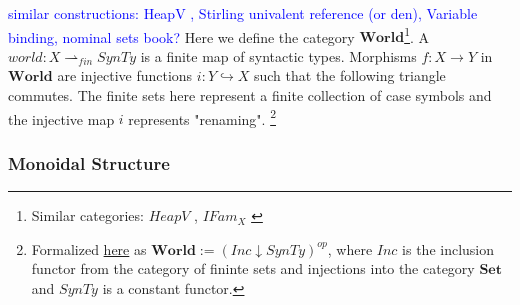 \documentclass{article}
\newcommand{\blue}[1]{\textcolor{blue}{#1}}
\newcommand{\world}{{\mathbf{World}}}
\begin{document}
\blue{similar constructions: HeapV \cite{SIMPSON-Independence}, Stirling univalent reference 
(or den), Variable binding, nominal sets book?}
 Here we define the category $\world$\footnote{Similar categories: $HeapV$ \cite{SIMPSON-Independence}, $IFam_X$ \cite{sterlingFreeTheoremsUnivalent}}. A $world : X \rightharpoonup_{fin} 
 SynTy$ is a finite map of syntactic types. Morphisms $f : X \rightarrow Y$ 
 in $\world$ are injective functions $i : Y \hookrightarrow X$ such that the 
 following triangle commutes. The finite sets here represent a finite 
 collection of case symbols and the injective map $i$ represents "renaming".
 \footnote{Formalized 
 \href{https://github.com/bond15/Bunched-CBPV/blob/68f8b4d006edc9df1d830d7f9cc63822ec77a379/src/Data/Worlds.agda#L33}{here} 
 as $\world := (Inc \downarrow SynTy)^{op}$, where $Inc$ is the inclusion
  functor from the category of fininte sets and injections into the category 
  $\mathbf{Set}$ and $SynTy$ is a constant functor. }
 

\begin{figure}[!ht]
    \centering
\end{figure}
 
 
\begin{comment}
Previously, I had maps between worlds as "injections" where the source map was 
included in the domain map. I've flipped the ordering to make the DCC obviously 
affine(monoidal unit is isomorphic to cartesian unit).    
\end{comment}



  \subsubsection{Monoidal Structure}
\end{document}
